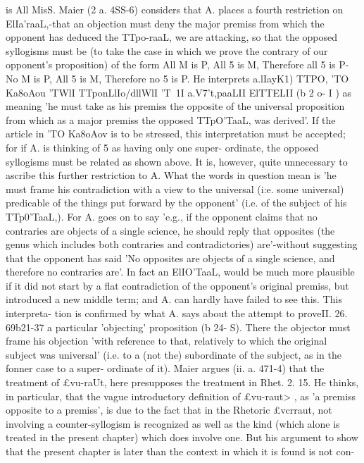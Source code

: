 {{{{{{{{{{{{{{{{{{{{{{{{{{{{{is All MisS.
Maier (2 a. 4SS-6) considers that A. places a fourth restriction
on ElIa'raaL,-that an objection must deny the major premiss from
which the opponent has deduced the TTpo-raaL, we are attacking,
so that the opposed syllogisms must be (to take the case in which
we prove the contrary of our opponent's proposition) of the form
All M is P, All 5 is M, Therefore all 5 is P-No M is P, All
5 is M, Therefore no 5 is P. He interprets a.lIayK1) TTPO, 'TO Ka8oAou
'TWlI TTponLlIo/dllWlI 'T~1I a.V7't,paaLII ElTTELII (b 2 o- I ) as meaning 'he must
take as his premiss the opposite of the universal proposition from
which as a major premiss the opposed TTpO'TaaL, was derived'. If
the article in 'TO Ka8oAov is to be stressed, this interpretation must
be accepted; for if A. is thinking of 5 as having only one super-
ordinate, the opposed syllogisms must be related as shown
above. It is, however, quite unnecessary to ascribe this further
restriction to A. What the words in question mean is 'he must
frame his contradiction with a view to the universal (i:e. some
universal) predicable of the things put forward by the opponent'
(i.e. of the subject of his TTp0'TaaL,). For A. goes on to say 'e.g., if
the opponent claims that no contraries are objects of a single
science, he should reply that opposites (the genus which includes
both contraries and contradictories) are'-without suggesting that
the opponent has said 'No opposites are objects of a single science,
and therefore no contraries are'. In fact an ElIO'TaaL, would be
much more plausible if it did not start by a flat contradiction
of the opponent's original premiss, but introduced a new middle
term; and A. can hardly have failed to see this. This interpreta-
tion is confirmed by what A. says about the attempt to proveII. 26. 69b21-37
a particular 'objecting' proposition (b 24- S). There the objector
must frame his objection 'with reference to that, relatively to
which the original subject was universal' (i.e. to a (not the)
subordinate of the subject, as in the fonner case to a super-
ordinate of it).
Maier argues (ii. a. 471-4) that the treatment of £vu-raUt, here
presupposes the treatment in Rhet. 2. 15. He thinks, in particular,
that the vague introductory definition of £vu-raut> , as 'a premiss
opposite to a premiss', is due to the fact that in the Rhetoric
£vcrraut, not involving a counter-syllogism is recognized as well
as the kind (which alone is treated in the present chapter) which
does involve one. But his argument to show that the present
chapter is later than the context in which it is found is not con-
}}}}}}}}}}}}}}}}}}}}}}}}}}}}}
